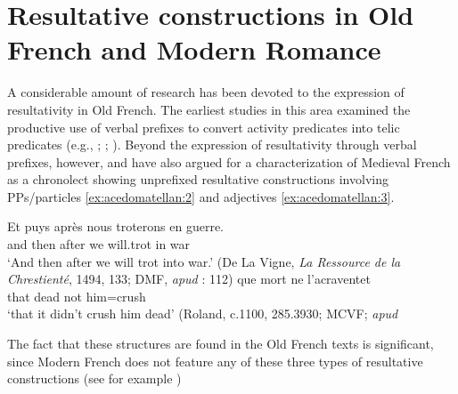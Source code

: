 \documentclass[output=paper,colorlinks,citecolor=brown,
]{langscibook}
\begin{document}
 
\section{Resultative constructions in Old French and Modern Romance}\label{sec:acedomatellan:3}

 A considerable amount of research has been devoted to the expression of resultativity in Old French. The earliest studies in this area examined the productive use of verbal prefixes to convert activity predicates into telic predicates (e.g., \citealt{buridant1995preverbes, buridant2000nouvelle}; \citealt{dufresne2001changement, dufresne2003preverbs}; \citealt{kopecka2009continuity}). Beyond the expression of resultativity through verbal prefixes, however, \citet{trobergburnett} and \citet{TrobergandBurnett2017} have also argued for a characterization of Medieval French as a chronolect showing unprefixed resultative constructions involving PPs/particles \ref{ex:acedomatellan:2} and adjectives \ref{ex:acedomatellan:3}.


\ea
  \ea\label{ex:acedomatellan:2}
    \gll Et puys après nous troterons en guerre.	\\
and then after we will.trot in war\\
    \glt ‘And then after we will trot into war.’ (De La Vigne, \textit{La Ressource de la Chrestienté}, 1494, 133; DMF, \textit{apud} \citeauthor{TrobergandBurnett2017} \citeyear{TrobergandBurnett2017}: 112)
  \ex\label{ex:acedomatellan:3}
    \gll que	mort	ne	l’acraventet \\
that	dead	not	him=crush\\
    \glt ‘that it didn’t crush him dead’ (Roland, c.1100, 285.3930; MCVF; \textit{apud} \citep[114]{TrobergandBurnett2017} 
  \z 
\z 

The fact that these structures are found in the Old French texts is significant, since Modern French does not feature any of these three types of resultative constructions (see for example \citealt{FongandPoulin1998})
\end{document}
